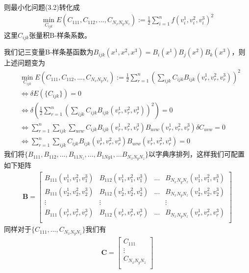 则最小化问题(3.2)转化成
\begin{equation}
    \begin{split}
        \min_{C_{ijk}}E(C_{111},C_{112},...,C_{N_xN_yN_z}):=\frac{1}{2}\sum_{i = 1}^{n} f(v_i^1,v_i^2,v_i^3)^2 
    \end{split}
\end{equation}
这里$C_{ijk}$张量积B-样条系数。

我们记三变量B-样条基函数为$B_{ijk}(x^1,x^2,x^3) = B_i(x^1)B_j(x^2)B_k(x^3)$，则上述问题变为
\begin{equation}
    \begin{split}
        &\min_{C_{ijk}}E(C_{111},C_{112},...,C_{N_xN_yN_z}):= \frac{1}{2}\sum_{r = 1}^{n} (\sum_{ijk}C_{ijk}B_{ijk}(v_r^1,v_r^2,v_r^3))^2 \\
        &\Leftrightarrow \delta E(\{C_{ijk}\}) = 0\\
        &\Leftrightarrow \delta (\frac{1}{2}\sum_{r = 1}^{n} (\sum_{ijk}C_{ijk}B_{ijk}(v_r^1,v_r^2,v_r^3))^2) = 0\\
        &\Leftrightarrow \sum_{r = 1}^{n} \sum_{ijk} \sum_{uvw}C_{ijk}B_{ijk}(v_r^1,v_r^2,v_r^3)B_{uvw}(v_r^1,v_r^2,v_r^3)\delta C_{uvw} = 0\\
        &\Leftrightarrow \sum_{r = 1}^n \sum_{ijk} C_{ijk} B_{ijk}(v_r^1,v_r^2,v_r^3)B_{uvw}(v_r^1,v_r^2,v_r^3) = 0
    \end{split}
\end{equation}
我们将$\{B_{111},B_{112},...,B_{11N_z},...,B_{1Ny1},...B_{N_xN_yN_z}\}$以字典序排列，这样我们可配置如下矩阵
\begin{align*}
    \mathbf{B} = \begin{bmatrix}
        B_{111}(v_1^1,v_1^2,v_1^3) & B_{112}(v_1^1,v_1^2,v_1^3) &...& B_{N_xN_yN_z}(v_1^1,v_1^2,v_1^3)\\
        B_{111}(v_2^1,v_2^2,v_2^3) & B_{112}(v_2^1,v_2^2,v_2^3) &...& B_{N_xN_yN_z}(v_2^1,v_2^2,v_2^3)\\
         \vdots & \vdots & & \vdots\\
        B_{111}(v_r^1,v_r^2,v_r^3) & B_{112}(v_r^1,v_r^2,v_r^3) &...& B_{N_xN_yN_z}(v_r^1,v_r^2,v_r^3)\\
    \end{bmatrix}
\end{align*}
同样对于$\{C_{111},...,C_{N_xN_yN_z}\}$我们有
\begin{align*}
    \mathbf{C} = \begin{bmatrix}
        C_{111} \\
        \vdots \\
        C_{N_xN_yN_z}\\
    \end{bmatrix}
\end{align*}
